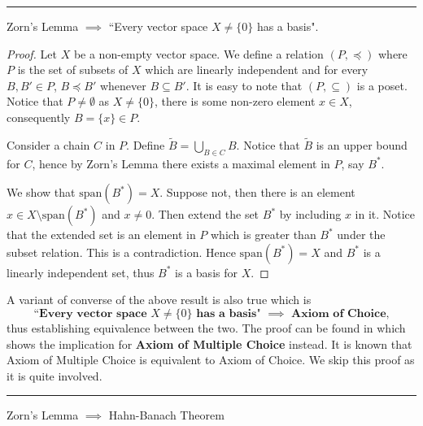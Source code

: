 \documentclass[11pt,a4paper]{article}
\begin{document}
\par\noindent\rule{\textwidth}{0.4pt}

\begin{theorem}
    Zorn's Lemma $\implies$ ``Every vector space $X\neq \{0\}$ has a basis".
\end{theorem}

\begin{proof}
    Let $X$ be a non-empty vector space. We define a relation $(P,\preccurlyeq)$ where $P$ is the set of subsets of $X$ which are linearly independent and for every $B,B'\in P$, $B\preccurlyeq B'$ whenever $B\subseteq B'$. It is easy to note that $(P,\subseteq)$ is a poset. Notice that $P\neq \emptyset$ as $X\neq \{0\}$, there is some non-zero element $x\in X$, consequently $B = \{x\}\in P$.
    
    Consider a chain $C$ in $P$. Define $\tilde{B} = \bigcup_{B\in C}B$. Notice that $\tilde{B}$ is an upper bound for $C$, hence by Zorn's Lemma there exists a maximal element in $P$, say $B^*$.
    
    We show that $\text{span}(B^*) = X$. Suppose not, then there is an element $x\in X\setminus \text{span}(B^*)$ and $x\neq 0$. Then extend the set $B^*$ by including $x$ in it. Notice that the extended set is an element in $P$ which is greater than $B^*$ under the subset relation. This is a contradiction. Hence $\text{span}(B^*) = X$ and $B^*$ is a linearly independent set, thus $B^*$ is a basis for $X$.
\end{proof}

\begin{note}
    A variant of converse of the above result is also true which is 
    $$
    \textbf{``Every vector space $X\neq \{0\}$ has a basis" $\implies$ Axiom of Choice,}
    $$
    thus establishing equivalence between the two. The proof can be found in \textbf{\cite{bases_AC}} which shows the implication for \textbf{Axiom of Multiple Choice} instead. It is known that Axiom of Multiple Choice is equivalent to Axiom of Choice. We skip this proof as it is quite involved.
\end{note}


\par\noindent\rule{\textwidth}{0.4pt}

\begin{theorem}
    Zorn's Lemma $\implies$ Hahn-Banach Theorem
\end{theorem}
\end{document}
